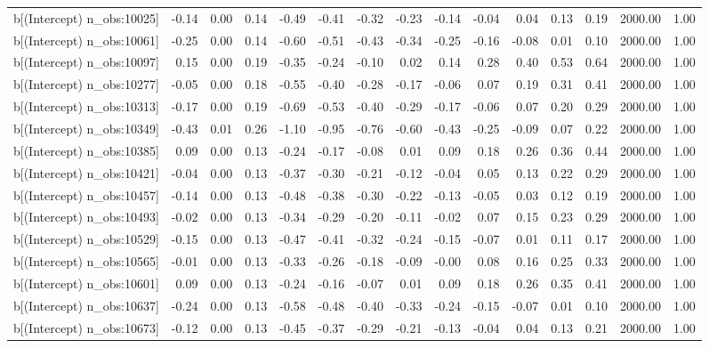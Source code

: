 \begin{table}[ht]
\begin{tabular}{rrrrrrrrrrrrrrr}
  b[(Intercept) n\_obs:10025] & -0.14 & 0.00 & 0.14 & -0.49 & -0.41 & -0.32 & -0.23 & -0.14 & -0.04 & 0.04 & 0.13 & 0.19 & 2000.00 & 1.00 \\ 
  b[(Intercept) n\_obs:10061] & -0.25 & 0.00 & 0.14 & -0.60 & -0.51 & -0.43 & -0.34 & -0.25 & -0.16 & -0.08 & 0.01 & 0.10 & 2000.00 & 1.00 \\ 
  b[(Intercept) n\_obs:10097] & 0.15 & 0.00 & 0.19 & -0.35 & -0.24 & -0.10 & 0.02 & 0.14 & 0.28 & 0.40 & 0.53 & 0.64 & 2000.00 & 1.00 \\ 
  b[(Intercept) n\_obs:10277] & -0.05 & 0.00 & 0.18 & -0.55 & -0.40 & -0.28 & -0.17 & -0.06 & 0.07 & 0.19 & 0.31 & 0.41 & 2000.00 & 1.00 \\ 
  b[(Intercept) n\_obs:10313] & -0.17 & 0.00 & 0.19 & -0.69 & -0.53 & -0.40 & -0.29 & -0.17 & -0.06 & 0.07 & 0.20 & 0.29 & 2000.00 & 1.00 \\ 
  b[(Intercept) n\_obs:10349] & -0.43 & 0.01 & 0.26 & -1.10 & -0.95 & -0.76 & -0.60 & -0.43 & -0.25 & -0.09 & 0.07 & 0.22 & 2000.00 & 1.00 \\ 
  b[(Intercept) n\_obs:10385] & 0.09 & 0.00 & 0.13 & -0.24 & -0.17 & -0.08 & 0.01 & 0.09 & 0.18 & 0.26 & 0.36 & 0.44 & 2000.00 & 1.00 \\ 
  b[(Intercept) n\_obs:10421] & -0.04 & 0.00 & 0.13 & -0.37 & -0.30 & -0.21 & -0.12 & -0.04 & 0.05 & 0.13 & 0.22 & 0.29 & 2000.00 & 1.00 \\ 
  b[(Intercept) n\_obs:10457] & -0.14 & 0.00 & 0.13 & -0.48 & -0.38 & -0.30 & -0.22 & -0.13 & -0.05 & 0.03 & 0.12 & 0.19 & 2000.00 & 1.00 \\ 
  b[(Intercept) n\_obs:10493] & -0.02 & 0.00 & 0.13 & -0.34 & -0.29 & -0.20 & -0.11 & -0.02 & 0.07 & 0.15 & 0.23 & 0.29 & 2000.00 & 1.00 \\ 
  b[(Intercept) n\_obs:10529] & -0.15 & 0.00 & 0.13 & -0.47 & -0.41 & -0.32 & -0.24 & -0.15 & -0.07 & 0.01 & 0.11 & 0.17 & 2000.00 & 1.00 \\ 
  b[(Intercept) n\_obs:10565] & -0.01 & 0.00 & 0.13 & -0.33 & -0.26 & -0.18 & -0.09 & -0.00 & 0.08 & 0.16 & 0.25 & 0.33 & 2000.00 & 1.00 \\ 
  b[(Intercept) n\_obs:10601] & 0.09 & 0.00 & 0.13 & -0.24 & -0.16 & -0.07 & 0.01 & 0.09 & 0.18 & 0.26 & 0.35 & 0.41 & 2000.00 & 1.00 \\ 
  b[(Intercept) n\_obs:10637] & -0.24 & 0.00 & 0.13 & -0.58 & -0.48 & -0.40 & -0.33 & -0.24 & -0.15 & -0.07 & 0.01 & 0.10 & 2000.00 & 1.00 \\ 
  b[(Intercept) n\_obs:10673] & -0.12 & 0.00 & 0.13 & -0.45 & -0.37 & -0.29 & -0.21 & -0.13 & -0.04 & 0.04 & 0.13 & 0.21 & 2000.00 & 1.00 \\ 

\end{tabular}
\end{table}
